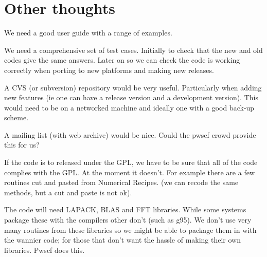 \chapter{Other thoughts}

We need a good user guide with a range of examples.

We need a comprehensive set of test cases. Initially to check that the new
and old codes give the same answers. Later on so we can check the code is
working correctly when porting to new platforms and making new releases.

A CVS (or subversion) repository would be very useful. Particularly when
adding new features (ie one can have a release version and a development
version). This would need to be on a networked machine and ideally one
with a good back-up scheme.

A mailing list (with web archive) would be nice. Could the pwscf crowd
provide this for us?

If the code is to released under the GPL, we have to be sure that all of
the code complies with the GPL. At the moment it doesn't. For example
there are a few routines cut and pasted from Numerical Recipes. (we can
recode the same methods, but a cut and paste is not ok).

The code will need LAPACK, BLAS and FFT libraries. While some systems
package these with the compilers other don't (such as g95). We don't use
very many routines from these libraries so we 
might be able to package them in with the wannier code; for those that
don't want the hassle 
of making their own libraries. Pwscf does this.
